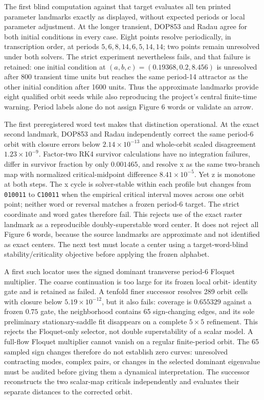 The first blind computation against that target evaluates all ten printed
parameter landmarks exactly as displayed, without expected periods or local
parameter adjustment.  At the longer transient, DOP853 and Radau agree for
both initial conditions in every case.  Eight points resolve periodically, in
transcription order, at periods
$5,6,8,14,6,5,14,14$; two points remain unresolved under both solvers.  The
strict experiment nevertheless fails, and that failure is retained: one
initial condition at $(a,b,c)=(0.19368,0.2,8.456)$ is unresolved after 800
transient time units but reaches the same period-14 attractor as the other
initial condition after 1600 units.  Thus the approximate landmarks provide
eight qualified orbit seeds while also reproducing the project's central
finite-time warning.  Period labels alone do not assign Figure 6 words or
validate an arrow.

The first preregistered word test makes that distinction operational.  At the
exact second landmark, DOP853 and Radau independently correct the same period-6
orbit with closure errors below $2.14\times10^{-13}$ and whole-orbit scaled
disagreement $1.23\times10^{-9}$.  Factor-two RK4 survivor calculations have
no integration failures, differ in survivor fraction by only $0.001465$, and
resolve x as the same two-branch map with normalized critical-midpoint
difference $8.41\times10^{-5}$.  Yet z is monotone at both steps.  The x cycle
is solver-stable within each profile but changes from \texttt{010011} to
\texttt{C10011} when the empirical critical interval moves across one orbit
point; neither word or reversal matches a frozen period-6 target.  The strict
coordinate and word gates therefore fail.  This rejects use of the exact
raster landmark as a reproducible doubly-superstable word center.  It does not
reject all Figure 6 words, because the source landmarks are approximate and
not identified as exact centers.  The next test must locate a center using a
target-word-blind stability/criticality objective before applying the frozen
alphabet.

A first such locator uses the signed dominant transverse period-6 Floquet
multiplier.  The coarse continuation is too large for its frozen local orbit-
identity gate and is retained as failed.  A tenfold finer successor resolves
289 orbit cells with closure below $5.19\times10^{-12}$, but it also fails:
coverage is $0.655329$ against a frozen $0.75$ gate, the neighborhood contains
65 sign-changing edges, and its sole preliminary stationary-saddle fit
disappears on a complete $5\times5$ refinement.  This rejects the Floquet-only
selector, not double superstability of a scalar model.  A full-flow Floquet
multiplier cannot vanish on a regular finite-period orbit.  The 65 sampled
sign changes therefore do not establish zero curves: unresolved contracting
modes, complex pairs, or changes in the selected dominant eigenvalue must be
audited before giving them a dynamical interpretation.  The successor
reconstructs the two scalar-map criticals independently and evaluates their
separate distances to the corrected orbit.

